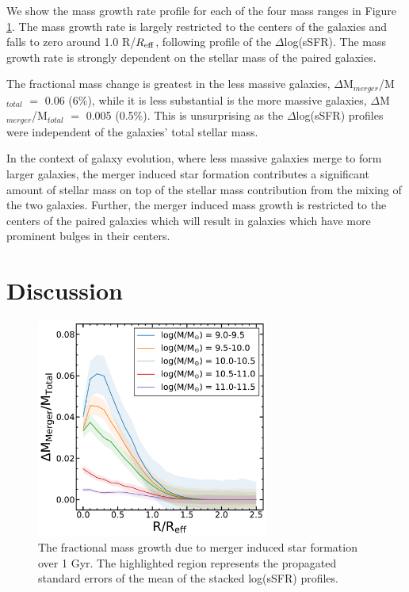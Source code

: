 \documentclass[iop,revtex4,twocolumn,apj,numberedappendix,appendixfloats]{emulateapj}
\newcommand{\reff}{$R_{\rm eff}$}
\newcommand{\logm}{log({\it M}/M$_{\odot}$)}
\begin{document}
We show the mass growth rate profile for each of the four mass ranges in Figure \ref{fig:mass_gain_sum}. The mass growth rate is largely restricted to the centers of the galaxies and falls to zero around 1.0 R/\reff, following profile of the $\Delta$log(sSFR). The mass growth rate is strongly dependent on the stellar mass of the paired galaxies. 

The fractional mass change is greatest in the less massive galaxies, $\Delta$M$_{merger}$/M$_{total}$ $=$ 0.06 (6\%), while it is less substantial is the more massive galaxies, $\Delta$M$_{merger}$/M$_{total}$ $=$ 0.005 (0.5\%). This is unsurprising as the $\Delta$log(sSFR) profiles were independent of the galaxies' total stellar mass. 


In the context of galaxy evolution, where less massive galaxies merge to form larger galaxies, the merger induced star formation contributes a significant amount of stellar mass on top of the stellar mass contribution from the mixing of the two galaxies. Further, the merger induced mass growth is restricted to the centers of the paired galaxies which will result in galaxies which have more prominent bulges in their centers.  

\section{Discussion}\label{sec:disc}
\begin{figure}
\centering
\includegraphics[width=3in]{fig/mass_gain.pdf}
\caption[The fractional mass gain due to merger induced star formation.]{The fractional mass growth due to merger induced star formation over 1 Gyr. The highlighted region represents the propagated standard errors of the mean of the stacked log(sSFR) profiles. }
\label{fig:mass_gain_sum}
\end{figure}
\end{document}
